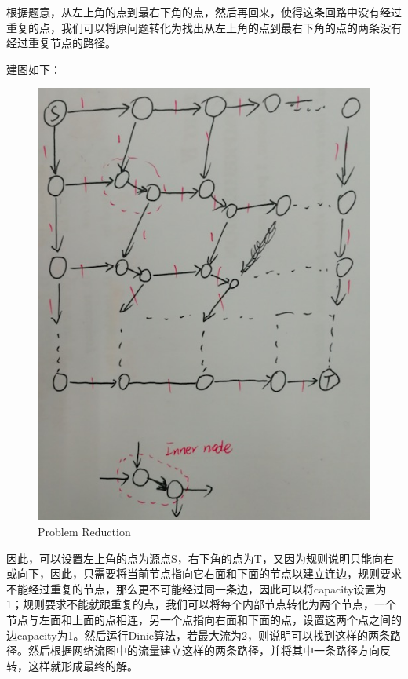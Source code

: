 \documentclass[UTF8,a4paper,12pt]{article}
\begin{document}
\begin{CJK}{UTF8}{gkai}
	根据题意，从左上角的点到最右下角的点，然后再回来，使得这条回路中没有经过重复的点，我们可以将原问题转化为找出从左上角的点到最右下角的点的两条没有经过重复节点的路径。
	
	建图如下：
	
	\begin{figure}[htb]
		\centering
		\includegraphics[scale=.6]{./4.png}
		\caption{Problem Reduction}
	\end{figure}
	
	因此，可以设置左上角的点为源点S，右下角的点为T，又因为规则说明只能向右或向下，因此，只需要将当前节点指向它右面和下面的节点以建立连边，规则要求不能经过重复的节点，那么更不可能经过同一条边，因此可以将capacity设置为1；规则要求不能就跟重复的点，我们可以将每个内部节点转化为两个节点，一个节点与左面和上面的点相连，另一个点指向右面和下面的点，设置这两个点之间的边capacity为1。然后运行Dinic算法，若最大流为2，则说明可以找到这样的两条路径。然后根据网络流图中的流量建立这样的两条路径，并将其中一条路径方向反转，这样就形成最终的解。
	


\end{CJK}
\end{document}
